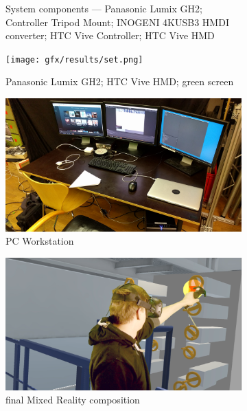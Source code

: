 \begin{figure}[htbp]
\begin{subfigure}[t]{.49\textwidth}
		\caption{System components ---  Panasonic Lumix GH2; 
			 Controller Tripod Mount;  INOGENI 4KUSB3 
			HMDI 
			converter;  HTC Vive Controller;  HTC Vive 
			HMD}
	\end{subfigure}
	\hfill
	\begin{subfigure}[t]{.49\textwidth}
		\centering
		\texttt{[image: gfx/results/set.png]}
		\caption{ Panasonic Lumix GH2;  HTC Vive HMD; 
			 green screen}
	\end{subfigure}
	\begin{subfigure}[t]{.49\textwidth}
		\centering
		\includegraphics[width=\textwidth]{gfx/results/pc.png}
		\caption{PC Workstation}
	\end{subfigure}
	\hfill
	\begin{subfigure}[t]{.49\textwidth}
		\centering
		\includegraphics[width=\textwidth]{gfx/results/mr-action_new.png}
		\caption{final Mixed Reality composition}
	\end{subfigure}
	\begin{subfigure}[t]{.49\textwidth}
		\centering

\end{subfigure}
\end{figure}
